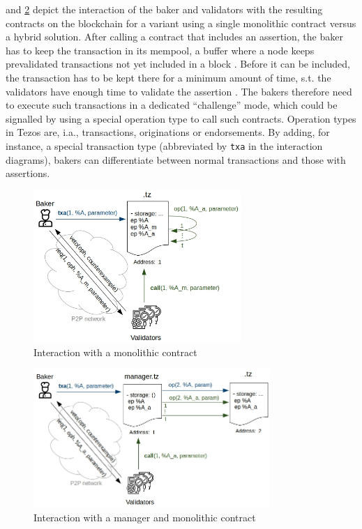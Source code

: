  and \ref{fig:interaction_monolithic_managertz} depict the interaction of the baker and validators with the resulting contracts on the blockchain for a variant using a single monolithic contract versus a hybrid solution. After calling a contract that includes an assertion, the baker has to keep the transaction in its mempool, a buffer where a node keeps prevalidated transactions not yet included in a block . Before it can be included, the transaction has to be kept there for a minimum amount of time, s.t. the validators have enough time to validate the assertion . The bakers therefore need to execute such transactions in a dedicated ``challenge'' mode, which could be signalled by using a special operation type to call such contracts. Operation types in Tezos are, i.a., transactions, originations or endorsements. By adding, for instance, a special transaction type (abbreviated by \texttt{txa} in the interaction diagrams), bakers can differentiate between normal transactions and those with assertions.
\begin{figure}[h]
\centering
  \includegraphics[width=0.7\textwidth]{figures/4-offline_tezos/interaction_monolithic.jpg}
	\caption{Interaction with a monolithic contract}
	\label{fig:interaction_monolithic}
\end{figure}

\begin{figure}[h]
\centering
  \includegraphics[width=0.8\textwidth]{figures/4-offline_tezos/interaction_monolithic_managertz.jpg}
	\caption{Interaction with a manager and monolithic contract}
	\label{fig:interaction_monolithic_managertz}
\end{figure}

